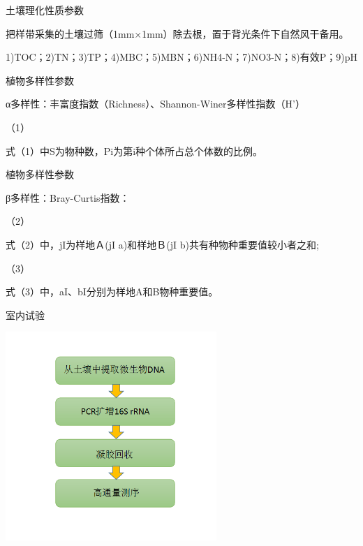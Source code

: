 \begin{frame}{\insertsection}{\insertsubsection}
	土壤理化性质参数
	
	把样带采集的土壤过筛（1mm×1mm）除去根，置于背光条件下自然风干备用。
	
	1)TOC；2)TN；3)TP；4)MBC；5)MBN；6)NH4-N；7)NO3-N；8)有效P；9)pH
\end{frame}
\begin{frame}{\insertsection}{\insertsubsection}
	植物多样性参数
	
	α多样性：丰富度指数（Richness）、Shannon-Winer多样性指数（H'）
	
	（1）
	
	式（1）中S为物种数，Pi为第i种个体所占总个体数的比例。
\end{frame}
\begin{frame}{\insertsection}{\insertsubsection}
	植物多样性参数
	
	β多样性：Bray-Curtis指数：
	
	（2）
	
	式（2）中，jI为样地Ａ(jI a)和样地Ｂ(jI b)共有种物种重要值较小者之和;
	
	（3）
	
	式（3）中，aI、bI分别为样地A和B物种重要值。
\end{frame}
\begin{frame}{\insertsection}{\insertsubsection}
	室内试验
	
		\begin{center}
			\includegraphics[width = 0.6\textwidth]{./pic/2.1.3.png}
		\end{center}
\end{frame}


